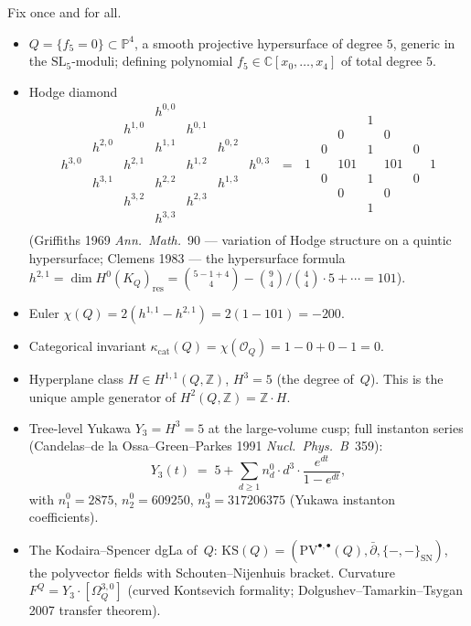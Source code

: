 \documentclass[11pt]{amsart}
\providecommand{\C}{\mathbb{C}}
\providecommand{\Z}{\mathbb{Z}}
\providecommand{\P}{\mathbb{P}}
\providecommand{\cO}{\mathcal{O}}
\providecommand{\SL}{\mathrm{SL}}
\providecommand{\PV}{\mathrm{PV}}
\providecommand{\KS}{\mathrm{KS}}
\providecommand{\kcat}{\kappa_{\mathrm{cat}}}
\begin{document}
Fix once and for all.
\begin{itemize}
\item $Q = \{f_5 = 0\} \subset \P^4$, a smooth projective hypersurface
of degree $5$, generic in the $\SL_5$-moduli; defining polynomial
$f_5 \in \C[x_0, \ldots, x_4]$ of total degree $5$.
\item Hodge diamond
\[
\begin{array}{ccccccc}
& & & h^{0,0} & & & \\
& & h^{1,0} & & h^{0,1} & & \\
& h^{2,0} & & h^{1,1} & & h^{0,2} & \\
h^{3,0} & & h^{2,1} & & h^{1,2} & & h^{0,3} \\
& h^{3,1} & & h^{2,2} & & h^{1,3} & \\
& & h^{3,2} & & h^{2,3} & & \\
& & & h^{3,3} & & & \\
\end{array}
\;=\;
\begin{array}{ccccccc}
& & & 1 & & & \\
& & 0 & & 0 & & \\
& 0 & & 1 & & 0 & \\
1 & & 101 & & 101 & & 1 \\
& 0 & & 1 & & 0 & \\
& & 0 & & 0 & & \\
& & & 1 & & & \\
\end{array}
\]
(Griffiths 1969 \textit{Ann.\ Math.}~90 --- variation of Hodge
structure on a quintic hypersurface; Clemens 1983 --- the hypersurface
formula $h^{2,1} = \dim H^0(K_Q)_{\text{res}} = \binom{5-1+4}{4} -
\binom{9}{4}/\binom{4}{4} \cdot 5 + \cdots = 101$).
\item Euler $\chi(Q) = 2(h^{1,1} - h^{2,1}) = 2(1 - 101) = -200$.
\item Categorical invariant
$\kcat(Q) = \chi(\cO_Q) = 1 - 0 + 0 - 1 = 0$.
\item Hyperplane class $H \in H^{1,1}(Q, \Z)$, $H^3 = 5$
(the degree of~$Q$). This is the unique ample generator of
$H^2(Q, \Z) = \Z \cdot H$.
\item Tree-level Yukawa $Y_3 = H^3 = 5$ at the large-volume cusp;
full instanton series (Candelas--de la Ossa--Green--Parkes 1991
\textit{Nucl.\ Phys.\ B}~359):
\[
Y_3(t) \;=\; 5 + \sum_{d \geq 1} n^0_d \cdot d^3 \cdot
\frac{e^{d t}}{1 - e^{d t}},
\]
with $n^0_1 = 2875$, $n^0_2 = 609250$, $n^0_3 = 317206375$
(Yukawa instanton coefficients).
\item The Kodaira--Spencer dgLa of~$Q$:
$\KS(Q) = (\PV^{\bullet, \bullet}(Q), \bar\partial, \{-,-\}_{\mathrm{SN}})$,
the polyvector fields with Schouten--Nijenhuis bracket. Curvature
$F^Q = Y_3 \cdot [\Omega_Q^{3,0}]$ (curved Kontsevich formality;
Dolgushev--Tamarkin--Tsygan 2007 transfer theorem).
\end{itemize}
\end{document}
